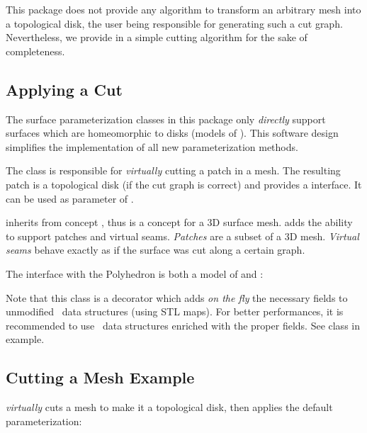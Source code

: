 This package does not provide any algorithm to transform an arbitrary mesh
into a topological disk, the user being responsible
for generating such a cut graph. Nevertheless, we provide in
 a simple cutting algorithm for
the sake of completeness.


\subsection{Applying a Cut}

The surface parameterization classes in this package only \emph{directly} support
 surfaces which are homeomorphic to disks (models of
). This software design simplifies the
implementation of all new parameterization methods.

The 
class is responsible for \emph{virtually} cutting
a patch in a  mesh.
The resulting patch is a topological
disk (if the cut graph is correct)
and provides a  interface. It can be used as
parameter of .

 inherits from concept ,
thus is a concept for a 3D surface mesh.
 adds the ability to support patches and
virtual seams. \emph{Patches} are a subset of a 3D mesh.
\emph{Virtual seams} behave exactly as if the surface was cut along a certain graph.

The  interface with the Polyhedron is both a model of
 and : \\

Note that this class is a decorator which adds {\em on the fly}
the necessary fields to unmodified \cgal\ data structures (using STL
maps). For better performances, it is recommended to use \cgal\ data
structures enriched with the proper fields. See 
class in  example.


\subsection{Cutting a Mesh Example}

 \emph{virtually} cuts a
 mesh
to make it a topological disk, then applies the default parameterization:


